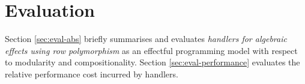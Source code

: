 \chapter{Evaluation}
Section \ref{sec:eval-abs} briefly summarises and evaluates \emph{handlers for algebraic effects using row polymorphism} as an effectful programming model with respect to modularity and compositionality. Section \ref{sec:eval-performance} evaluates the relative performance cost incurred by handlers.